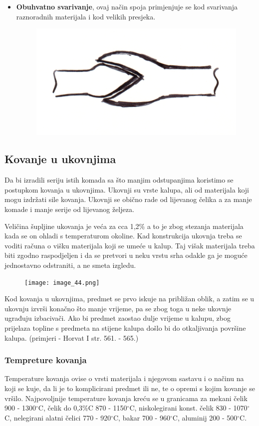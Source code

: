 \documentclass[a4paper,12pt]{article}
\numberwithin{figure}{section}
\begin{document}
\begin{itemize}
\begin{figure}[!h]
\end{figure}
\FloatBarrier\item \textbf{Obuhvatno svarivanje}, ovaj način spoja primjenjuje se kod svarivanja raznoradnih materijala i kod velikih presjeka.
\begin{figure}[!h]
\centering
\includegraphics[scale=0.15]{image_43-3.png}
\end{figure}
\FloatBarrier\end{itemize}
\subsection{Kovanje u ukovnjima}
Da bi izradili seriju istih komada sa što manjim odstupanjima koristimo se postupkom kovanja u ukovnjima. Ukovnji su vrste kalupa, ali od materijala koji mogu izdržati sile kovanja. Ukovnji se obično rade od lijevanog čelika a za manje komade i manje serije od lijevanog željeza.\par
Veličina šupljine ukovanja je veća za cca 1,2\% a to je zbog stezanja materijala kada se on ohladi s temperaturom okoline. Kad konstrukcija ukovnja treba se voditi računa o višku materijala koji se umeće u kalup. Taj višak materijala treba biti zgodno raspodjeljen i da se pretvori u neku vrstu srha odakle ga je moguće jednostavno odstraniti, a ne smeta izgledu.
\begin{figure}[!h]
\centering
\texttt{[image: image\_44.png]}
\end{figure}
\FloatBarrier
Kod kovanja u ukovnjima, predmet se prvo iskuje na približan oblik, a zatim se u ukovnju izvrši konačno što manje vrijeme, pa se zbog toga u neke ukovnje ugrađuju izbacivači. Ako bi predmet zaostao dulje vrijeme u kalupu, zbog prijelaza topline s predmeta na stijene kalupa došlo bi do otkaljivanja površine kalupa. (primjeri - Horvat I str. 561. - 565.)
\subsubsection{Tempreture kovanja}
Temperature kovanja ovise o vrsti materijala i njegovom sastavu i o načinu na koji se kuje, da li je to komplicirani predmet ili ne, te o opremi s kojim kovanje se vršilo. Najpovoljnije temperature kovanja kreću se u granicama za mekani čelik 900 - 1300$^{\circ}$C, čelik do 0,3$\%$C 870 - 1150$^{\circ}$C, niskolegirani konst. čelik 830 - 1070$^{\circ}$C, nelegirani alatni čelici 770 - 920$^{\circ}$C, bakar 700 - 960$^{\circ}$C, aluminij 200 - 500$^{\circ}$C.
\clearpage
\end{document}
